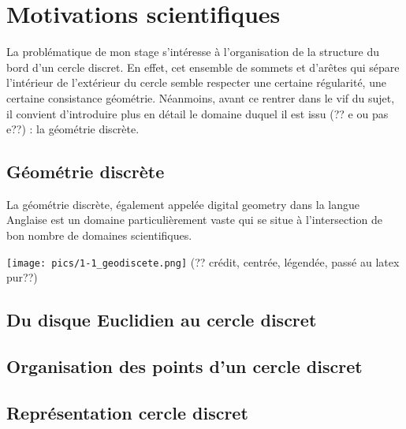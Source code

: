 


\section{Motivations scientifiques}
\label{pt1-ch1-sec:2}

La problématique de mon stage s'intéresse à l'organisation de la structure du bord d'un cercle discret. En effet, cet ensemble de sommets et d'arêtes qui sépare l'intérieur de l'extérieur du cercle semble respecter une certaine régularité, une certaine consistance géométrie.
Néanmoins, avant ce rentrer dans le vif du sujet, il convient d'introduire plus en détail le domaine duquel il est issu (?? e ou pas e??) : la géométrie discrète.


\subsection{Géométrie discrète}
\label{1.1-geodiscete.png}

La géométrie discrète, également appelée digital geometry dans la langue Anglaise est un domaine particulièrement vaste qui se situe à l'intersection de bon nombre de domaines scientifiques.


\texttt{[image: pics/1-1\_geodiscete.png]}
(?? crédit, centrée, légendée, passé au latex pur??)



\subsection{Du disque Euclidien au cercle discret}
\label{pt1-ch1-sec:2.2}

\subsection{Organisation des points d'un cercle discret}
\label{pt1-ch1-sec:2.3}

\subsection{Représentation cercle discret}
\label{pt1-ch1-sec:2.4}

